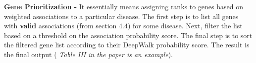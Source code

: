 \begin{sloppypar*}
    \noindent \textbf{Gene Prioritization -} It essentially means assigning ranks
    to genes based on weighted associations to a particular disease. The first step
    is to list all genes with \textbf{valid} associations (from section $4.4$) for
    some disease. Next, filter the list based on a threshold on the association
    probability score. The final step is to sort the filtered gene list according
    to their DeepWalk probability score. The result is the final output (
    \textit{Table III in the paper is an example}).


\end{sloppypar*}